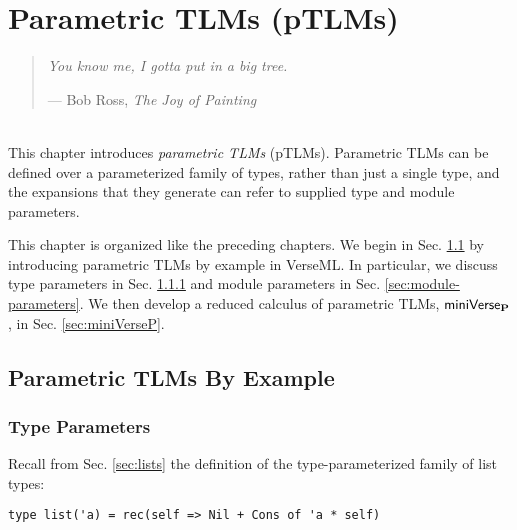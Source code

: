 
\chapter{Parametric TLMs (pTLMs)}\label{chap:ptsms}
\begin{quote}\textit{You know me, I gotta put in a big tree.}
\begin{flushright} --- Bob Ross, \emph{The Joy of Painting}\end{flushright}
\end{quote}
~\\
\noindent
This chapter introduces \emph{parametric TLMs} (pTLMs). Parametric TLMs can be defined over a parameterized family of types, rather than just a single type, and the expansions that they generate can refer to  supplied type and module parameters. 

This chapter is organized like the preceding chapters. We begin in Sec. \ref{sec:parameterized-tsms-by-example} by introducing parametric TLMs by example in VerseML. In particular, we discuss type parameters in Sec. \ref{sec:type-parameters} and module parameters in Sec. \ref{sec:module-parameters}. We then develop a reduced calculus of parametric TLMs, $\mathsf{miniVerse}_\textbf{P}$, in Sec. \ref{sec:miniVerseP}.

\section{Parametric TLMs By Example}\label{sec:parameterized-tsms-by-example}

\subsection{Type Parameters}\label{sec:type-parameters}
Recall from Sec. \ref{sec:lists} the definition of the type-parameterized family of list types:
\begin{lstlisting}[numbers=none]
type list('a) = rec(self => Nil + Cons of 'a * self)
\end{lstlisting}

